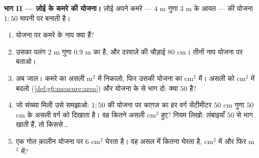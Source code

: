 \begin{problem}
\medskip
\noindent\textbf{भाग II --- ज़ोई के कमरे की योजना।}
ज़ोई अपने कमरे --- $4$ m गुणा $3$ m के आयत --- की योजना
$1:50$ मापनी पर बनाती है।
\begin{enumerate}[resume]
  \item योजना पर कमरे के नाप क्या हैं?
  \item उसका पलंग $2$ m गुणा $0.9$ m का है, और दरवाज़े की चौड़ाई
        $80$ cm। तीनों नाप योजना पर बताओ।
  \item अब जाल। कमरे का असली  m$^2$ में निकालो, फिर
        उसकी योजना का  cm$^2$ में। असली  को
        cm$^2$ में बदलो (\cref{def:g6:measure:area}) और योजना के
         से भाग दो: क्या  $50$ है?
  \item जो संख्या मिली उसे समझाओ: $1:50$ की योजना पर काग़ज़ का हर
        वर्ग सेंटीमीटर $50$ cm गुणा $50$ cm के असली वर्ग को
        दिखाता है। वह कितने असली cm$^2$ हुए? नियम लिखो: लंबाइयाँ
        $50$ से भाग खाती हैं, तो  किससे\,\dots
  \item एक गोल क़ालीन योजना पर $6$ cm$^2$ घेरता है। वह असल में
        कितना  घेरता है, cm$^2$ में और फिर m$^2$ में?
\end{enumerate}


\end{problem}
